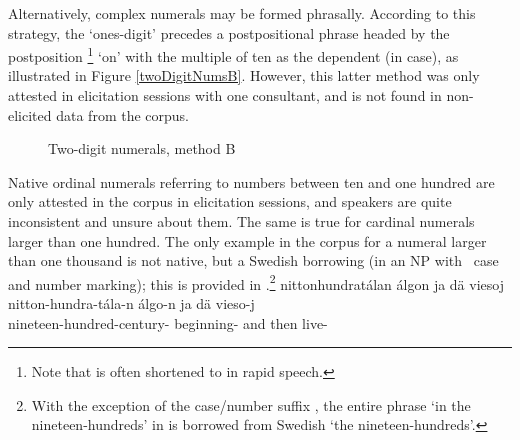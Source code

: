 Alternatively, complex numerals may be formed phrasally. According to this strategy, the ‘ones-digit’ precedes a postpositional phrase headed by the postposition \footnote{Note that  is often shortened to  in rapid speech.} 
‘on’ with the multiple of ten as the dependent  (in  case), as illustrated in Figure \vref{twoDigitNumsB}. %
However, this latter method was only attested in elicitation sessions with one consultant, and is not found in non-elicited data from the corpus.
\begin{figure}\centering
{}
\caption{Two-digit numerals, method B}\label{twoDigitNumsB}
\end{figure}

Native ordinal numerals referring to numbers between ten and one hundred are only attested in the corpus in elicitation sessions, and speakers are quite inconsistent and unsure about them. 
The same is true for cardinal numerals larger than one hundred. %
The only example in the corpus for a numeral larger than one thousand is not native, but a Swedish borrowing (in an NP with \PS\ case and number marking); this is provided in .\footnote{With the exception of the case/number suffix , the entire phrase  ‘in the nineteen-hundreds’ in  is borrowed from Swedish  ‘the nineteen-hundreds’.}
\ea\label{complexNumEx4}
\glll	nittonhundratálan álgon ja dä viesoj\\
	nitton-hundra-tála-n álgo-n ja dä vieso-j\\
	nineteen-hundred-century- beginning- and then live-\\
	
\z


